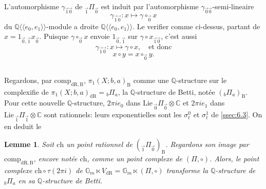 \documentclass[11pt,a4paper]{article}
\theoremstyle{plain}
\newtheorem{lemma}[theorem]{Lemme}
\theoremstyle{definition}
\newcommand{\Q}{\mathbb{Q}}
\newcommand{\C}{\mathbb{C}}
\newcommand{\Gm}{\mathbb{G}_m}
\newcommand{\dR}{\mathrm{dR}}
\newcommand{\B}{\mathrm{B}}
\newcommand{\comp}{\mathrm{comp}}
\begin{document}
L'automorphisme $\gamma_{\vec{1}\vec{0}}$ de ${}_{\vec{1}}\Pi_{\vec{0}}$ est induit par l'automorphisme $\gamma_{\vec{0}\vec{0}}$-semi-lineaire
\begin{equation}\label{eq:7.2.2}
\gamma_{\vec{1}\vec{0}}: x \mapsto \gamma \circ_{\vec{0}} x
\end{equation}
du $\Q\langle\langle e_0,e_1 \rangle\rangle$-module a droite $\Q\langle\langle e_0,e_1 \rangle\rangle$. Le verifier comme ci-dessus, partant de $x = 1_{\vec{0},\vec{1}} x_{\vec{0}}$. Puisque $\gamma \circ_{\vec{0}} x$ envoie $1_{\vec{0},\vec{1}}$ sur $\gamma \circ x_{\vec{1}\vec{0}}$, c'est aussi
\begin{equation}\label{eq:7.2.3}
\gamma_{\vec{1}\vec{0}}: x \mapsto \gamma \circ x, \quad \text{et donc}
\end{equation}
\begin{equation}\label{eq:7.2.4}
x \circ y = x \circ_{\vec{0}} y.
\end{equation}

\subsection{}\label{ssec:7.3}

Regardons, par $\comp_{\dR,\B}$, $\pi_1(X;b,a)_{\B}$ comme une $\Q$-structure sur le complexifie de $\pi_1(X;b,a)_{\dR} = {}_b\Pi_a$, la $\Q$-structure de Betti, not\'ee $({}_b\Pi_a)_{\B}$. Pour cette nouvelle $\Q$-structure, $2\pi i e_0$ dans $\mathrm{Lie}\,{}_{\vec{0}}\Pi_{\vec{0}} \otimes \C$ et $2\pi i e_1$ dans $\mathrm{Lie}\,{}_{\vec{1}}\Pi_{\vec{1}} \otimes \C$ sont rationnels: leurs exponentielles sont les $\sigma_t^0$ et $\sigma_t^1$ de \ref{ssec:6.3}. On en deduit le

\begin{lemma}\label{lem:7.4}
Soit $\mathrm{ch}$ un point rationnel de $({}_{\vec{1}}\Pi_{\vec{0}})_{\B}$. Regardons son image par $\comp_{\dR,\B}$, encore not\'ee $\mathrm{ch}$, comme un point complexe de $(\Pi, \circ)$. Alors, le point complexe $\mathrm{ch} \circ \tau(2\pi i)$ de $\Gm \ltimes V_{\dR} = \Gm \ltimes (\Pi, \circ)$ transforme la $\Q$-structure de ${}_b\Pi_a$ en sa $\Q$-structure de Betti.
\end{lemma}

\subsection{}\label{ssec:7.5}
\end{document}
